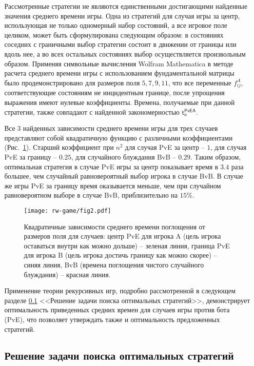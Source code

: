 Рассмотренные стратегии не являются единственными достигающими найденные значения среднего времени игры. Одна из стратегий для случая игры за центр, использующая не только одномерный набор состояний, а все игровое поле целиком, может быть сформулирована следующим образом: в состояниях соседних с граничными выбор стратегии состоит в движении от границы или вдоль нее, а во всех остальных состояниях выбор осуществляется произвольным образом. Применяя символьные вычисления Wolfram Mathematica в методе расчета среднего времени игры с использованием фундаментальной матрицы было продемонстрировано для размеров поля $5, 7, 9, 11$, что все переменные $f_{ij}^A$, соответствующие состояниям не инцидентным границе, после упрощения выражения имеют нулевые коэффициенты. Времена, получаемые при данной стратегии, также совпадают с найденной закономерностью $\boldsymbol{\mathsf{t_n^{PvE A}}}$.

Все 3 найденных зависимости среднего времени игры для трех случаев представляют собой квадратичную функцию с различными коэффициентами (Рис.~\cref{fig:quadratic:time}). Старший коэффициент при $n^2$ для случая PvE за центр -- $1$, для случая PvE за границу -- $0.25$, для случайного блуждания BvB -- $0.29$. Таким образом, оптимальная стратегия в случае PvE игры за центр показывает время в $3.4$ раза большее, чем случайный равновероятный выбор игрока в случае BvB. В случае же игры PvE за границу время оказывается меньше, чем при случайном равновероятном выборе в случае BvB, приблизительно на $15\%$.

\begin{figure}[t]
    \centering
    \texttt{[image: rw-game/fig2.pdf]}
    \caption{
        Квадратичные зависимости среднего времени поглощения от размеров поля для случаев: центр PvE для игрока A (цель игрока оставаться внутри как можно дольше) -- зеленая линия, граница PvE для игрока B (цель игрока достичь границу как можно скорее) -- синяя линия, BvB (времена поглощения чистого случайного блуждания) -- красная линия.
    }  
    \label{fig:quadratic:time}
\end{figure}

Применение теории рекурсивных игр, подробно рассмотренной в следующем разделе \cref{subsec:ch3/sec3/sub4} <<Решение задачи поиска оптимальных стратегий>>, демонстрирует оптимальность приведенных средних времен для случаев игры против бота (PvE), что позволяет утверждать также и оптимальность предложенных стратегий.

\subsection{Решение задачи поиска оптимальных стратегий}\label{subsec:ch3/sec3/sub4}

